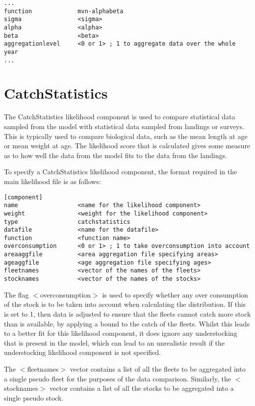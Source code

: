 \documentclass [a4paper, 10pt]{book}
\begin{document}
{\small\begin{verbatim}
...
function             mvn-alphabeta
sigma                <sigma>
alpha                <alpha>
beta                 <beta>
aggregationlevel     <0 or 1> ; 1 to aggregate data over the whole year
...
\end{verbatim}}

\section{CatchStatistics}\label{sec:catchstat}
The CatchStatistics likelihood component is used to compare statistical data sampled from the model with statistical data sampled from landings or surveys.  This is typically used to compare biological data, such as the mean length at age or mean weight at age.  The likelihood score that is calculated gives some measure as to how well the data from the model fits to the data from the landings.

\bigskip
To specify a CatchStatistics likelihood component, the format required in the main likelihood file is as follows:

{\small\begin{verbatim}
[component]
name                 <name for the likelihood component>
weight               <weight for the likelihood component>
type                 catchstatistics
datafile             <name for the datafile>
function             <function name>
overconsumption      <0 or 1> ; 1 to take overconsumption into account
areaaggfile          <area aggregation file specifying areas>
ageaggfile           <age aggregation file specifying ages>
fleetnames           <vector of the names of the fleets>
stocknames           <vector of the names of the stocks>
\end{verbatim}}

The flag $<$overconsumption$>$ is used to specify whether any over consumption of the stock is to be taken into account when calculating the distribution.  If this is set to 1, then data is adjusted to ensure that the fleets cannot catch more stock than is available, by applying a bound to the catch of the fleets.  Whilst this leads to a better fit for this likelihood component, it does ignore any understocking that is present in the model, which can lead to an unrealistic result if the understocking likelihood component is not specified.

\bigskip
The $<$fleetnames$>$ vector contains a list of all the fleets to be aggregated into a single pseudo fleet for the purposes of the data comparison.  Similarly, the $<$stocknames$>$ vector contains a list of all the stocks to be aggregated into a single pseudo stock.
\end{document}
